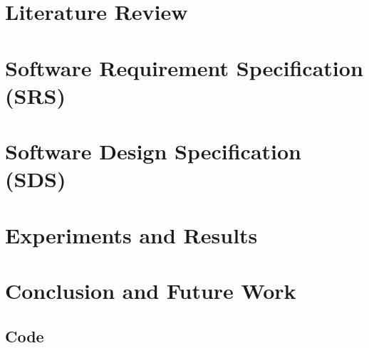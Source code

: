 \documentclass[12pt]{report}
\begin{document}
\chapter{Literature Review}
\label{chap:lit}


\chapter{Software Requirement Specification (SRS)}
\label{chap:srs}


\chapter{Software Design Specification (SDS)}
\label{chap:sds}


\chapter{Experiments and Results}
\label{chap:results}


\chapter{Conclusion and Future Work}
\label{chap:outro}


\begin{appendices}


\chapter{Code}

\end{appendices}

\printbibliography[heading=bibintoc,title={References}]
\end{document}
